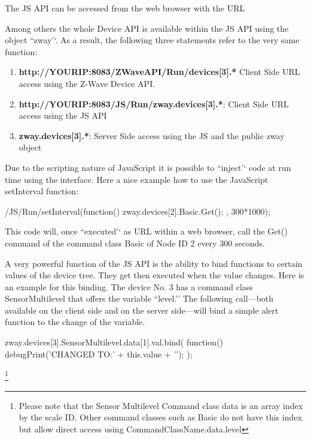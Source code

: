 The JS API can be accessed from the web browser with the URL



Among others the whole \zwave Device API is available within the JS API using 
the object ``zway’‘. As a result, the following three statements refer to the very same function:

\begin{enumerate}
\item \textbf{http://YOURIP:8083/ZWaveAPI/Run/devices[3].*} Client Side URL access using the Z-Wave Device API.
\item \textbf{http://YOURIP:8083/JS/Run/zway.devices[3].*}: Client Side URL access using the JS API
\item \textbf{zway.devices[3].*}: Server Side access using the JS and the public zway object
\end{enumerate}

Due to the scripting nature of JavaScript it is possible to ``inject’‘ code at run time 
using the interface. Here a nice example how to use the JavaScript setInterval function:

\begin{listingverbatim}
/JS/Run/setInterval(function() {
    zway.devices[2].Basic.Get();
}, 300*1000);
\end{listingverbatim}

This code will, once ``executed’‘ as URL within a web browser, call the Get() command
of the command class Basic of Node ID 2 every 300 seconds.

A very powerful function of the JS API is the ability to bind functions to certain values 
of the device tree. They get then executed when the value changes. Here is an example 
for this binding. The device No. 3 has a command class SensorMultilevel that offers 
the variable ``level.’’ The following call---both available on the client side and 
on the server side---will bind a simple alert function to the change of the variable.

\begin{listingverbatim}
zway.devices[3].SensorMultilevel.data[1].val.bind( 
	function() {
	debugPrint('CHANGED TO:' + this.value + '\n');
});
\end{listingverbatim}

\footnote{Please note that the Sensor Multilevel Command class data is an array index 
by the scale ID. Other command classes such as Basic do not have this index but allow 
direct access using CommandClassName.data.level}

